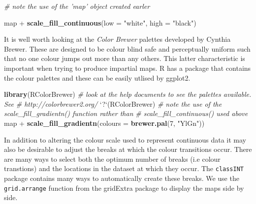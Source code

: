 \documentclass[]{article}
\newenvironment{Shaded}{}{}
\newcommand{\KeywordTok}[1]{\textcolor[rgb]{0.00,0.44,0.13}{\textbf{{#1}}}}
\newcommand{\DataTypeTok}[1]{\textcolor[rgb]{0.56,0.13,0.00}{{#1}}}
\newcommand{\DecValTok}[1]{\textcolor[rgb]{0.25,0.63,0.44}{{#1}}}
\newcommand{\StringTok}[1]{\textcolor[rgb]{0.25,0.44,0.63}{{#1}}}
\newcommand{\CommentTok}[1]{\textcolor[rgb]{0.38,0.63,0.69}{\textit{{#1}}}}
\newcommand{\NormalTok}[1]{{#1}}
\begin{document}
\begin{Shaded}
\begin{Highlighting}[]
\CommentTok{# note the use of the 'map' object created earler}

\NormalTok{map + }\KeywordTok{scale_fill_continuous}\NormalTok{(}\DataTypeTok{low =} \StringTok{"white"}\NormalTok{, }\DataTypeTok{high =} \StringTok{"black"}\NormalTok{)}
\end{Highlighting}
\end{Shaded}
It is well worth looking at the \emph{Color Brewer} palettes developed
by Cynthia Brewer. These are designed to be colour blind safe and
perceptually uniform such that no one colour jumps out more than any
others. This latter characteristic is important when trying to produce
impartial maps. R has a package that contains the colour palettes and
these can be easily utlised by ggplot2.

\begin{Shaded}
\begin{Highlighting}[]
\KeywordTok{library}\NormalTok{(RColorBrewer)}
\CommentTok{# look at the help documents to see the palettes available. See}
\CommentTok{# http://colorbrewer2.org/}
\StringTok{`}\DataTypeTok{?}\StringTok{`}\NormalTok{(RColorBrewer)}
\CommentTok{# note the use of the scale_fill_gradientn() function rather than}
\CommentTok{# scale_fill_continuous() used above}
\NormalTok{map + }\KeywordTok{scale_fill_gradientn}\NormalTok{(}\DataTypeTok{colours =} \KeywordTok{brewer.pal}\NormalTok{(}\DecValTok{7}\NormalTok{, }\StringTok{"YlGn"}\NormalTok{))}
\end{Highlighting}
\end{Shaded}
In addition to altering the colour scale used to represent continuous
data it may also be desirable to adjust the breaks at which the colour
transitions occur. There are many ways to select both the optimum number
of breaks (i.e colour transtions) and the locations in the dataset at
which they occur. The \texttt{classINT} package contains many ways to
automatically create these breaks. We use the \texttt{grid.arrange}
function from the gridExtra package to display the maps side by side.
\end{document}
